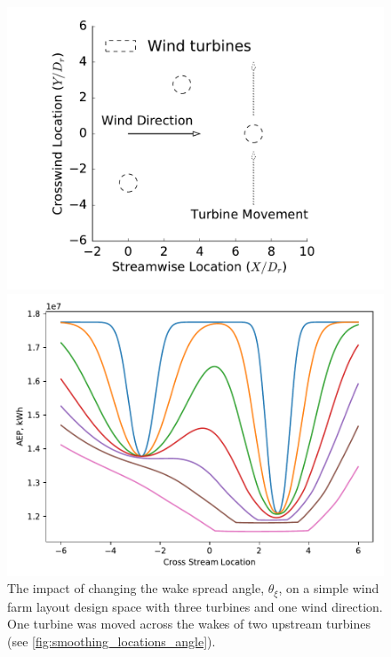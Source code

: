 \documentclass[a4paper]{jpconf}
\begin{document}
\begin{figure}[ht]
	\centering
	\begin{minipage}[t]{0.43\textwidth}
		\centering
		\includegraphics[width=\textwidth, trim={2cm 0cm 2cm 0cm}, clip]{smoothing_locations}
		\caption{Simple design space used to demonstrate the effects of the wake spreading angle relaxation factor, $\xi_k$, on the wind farm layout design space (see \cref{fig:wec_angle_cross_section}).}
		\label{fig:smoothing_locations_angle}
	\end{minipage}\hspace{1pc}%
	\begin{minipage}[t]{0.52\textwidth}
		\centering
		\includegraphics[width=\textwidth]{wec-with-no-ti-angle.pdf}
		\caption{The impact of changing the wake spread angle, $\theta_\xi$, on a simple wind farm layout design space with three turbines and one wind direction. One turbine was moved across the wakes of two upstream turbines (see \cref{fig:smoothing_locations_angle}). }
		\label{fig:wec_angle_cross_section}
	\end{minipage} 
\end{figure}
\end{document}
